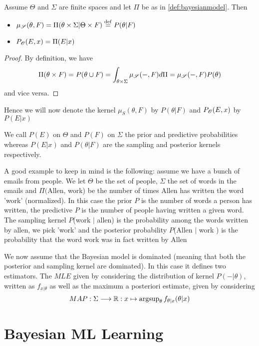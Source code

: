 \begin{lemma}
Assume $\Theta$ and $\Sigma$ are finite spaces and let $\Pi$ be as in \ref{def:bayesianmodel}. Then
\begin{itemize}
\item $\mu_\r{S}(\theta,F)=\Pi(\theta\times \Sigma \vert \Theta\times F)\define P(\theta\vert F)$
\item $P_\r{O}(E,x)=\Pi(E\vert x)$
\end{itemize}
\end{lemma}

\begin{proof}
By definition, we have
\[
\Pi(\theta \times F)=P(\theta\cup F)=\int_{\theta\times \Sigma} \mu_\r{S}(-,F)d\Pi=\mu_\r{S}(-,F)P(\theta)
\]
and vice versa.	
\end{proof}

Hence we will now denote the kernel $\mu_{S}(\theta , F)$ by $P(\theta \vert F)$ and $P_\r{O}(E,x)$ by $P(E\vert x)$

We call $P(E)$ on $\Theta$ and $P(F)$ on $\Sigma$ the prior and predictive probabilities whereas $P(E\vert x)$ and $P(\theta\vert F)$ are the sampling and posterior kernels respectively.

\begin{example}
A good example to keep in mind is the following: assume we have a bunch of emails from people. We let $\Theta$ be the set of people, $\Sigma$ the set of words in the emails and $\Pi($Allen, work) be the number of times Allen has written the word 'work' (normalized). In this case the prior  $P$ is the number of words a person has written, the predictive $P$  is the number of people having written a given word. The sampling kernel $P$(work $\vert$ allen) is the probability among the words written by allen, we pick 'work' and the posterior probability $P$(Allen $\vert$ work ) is the probability that the word work was in fact written by Allen
\end{example}
 
We now assume that the Bayesian model is dominated (meaning that both the posterior and sampling kernel are dominated). 
In this case it defines two estimators. The $MLE$ given by considering the distribution of kernel $P(- \vert \theta)$, written as $f_{x\vert \theta}$ as well as the maximum a posteriori estimate, given by considering
\[
MAP: \Sigma \longrightarrow \mathbb{R}: x \mapsto \operatorname{argsup}_\theta f_{\theta \vert x}(\theta \vert x)
\] 
 
\section{Bayesian ML Learning} 
 
